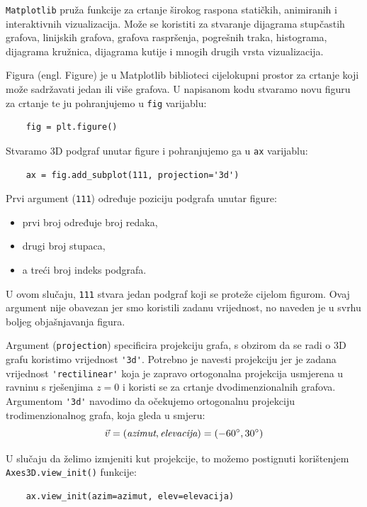 \verb|Matplotlib| pruža funkcije za crtanje širokog raspona statičkih, animiranih i interaktivnih vizualizacija.
Može se koristiti za stvaranje dijagrama stupčastih grafova, linijskih grafova, grafova raspršenja, pogrešnih traka,
histograma, dijagrama kružnica, dijagrama kutije i mnogih drugih vrsta vizualizacija.

Figura (engl. Figure) je u Matplotlib biblioteci cijelokupni prostor za crtanje koji može sadržavati jedan ili više grafova.
U napisanom kodu stvaramo novu figuru za crtanje te ju pohranjujemo u \verb|fig| varijablu:
\begin{verbatim}
    fig = plt.figure()
\end{verbatim}

Stvaramo 3D podgraf unutar figure i pohranjujemo ga u \verb|ax| varijablu:

\begin{verbatim}
    ax = fig.add_subplot(111, projection='3d')
\end{verbatim} 

Prvi argument (\verb|111|) određuje poziciju podgrafa unutar figure:
\begin{itemize}
    \item prvi broj određuje broj redaka,
    \item drugi broj stupaca,
    \item a treći broj indeks podgrafa.
\end{itemize}
U ovom slučaju, \verb|111| stvara jedan podgraf koji se proteže cijelom figurom. Ovaj argument nije obavezan jer smo koristili zadanu vrijednost, no naveden je u svrhu boljeg objašnjavanja figura.

Argument (\verb|projection|) specificira projekciju grafa, s obzirom da se radi o 3D grafu koristimo vrijednost \verb|'3d'|.
Potrebno je navesti projekciju jer je zadana vrijednost \verb|'rectilinear'| koja je zapravo ortogonalna projekcija usmjerena u ravninu s rješenjima $z = 0$ i koristi se za crtanje dvodimenzionalnih grafova.
Argumentom \verb|'3d'| navodimo da očekujemo ortogonalnu projekciju trodimenzionalnog grafa, koja gleda u smjeru:
$$
    \vec{v} = (\text{\it azimut}, \text{\it elevacija}) = (-60^{\circ}, 30^{\circ})
$$

U slučaju da želimo izmjeniti kut projekcije, to možemo postignuti korištenjem \verb|Axes3D.view_init()| funkcije:
\begin{verbatim}
    ax.view_init(azim=azimut, elev=elevacija)
\end{verbatim}

